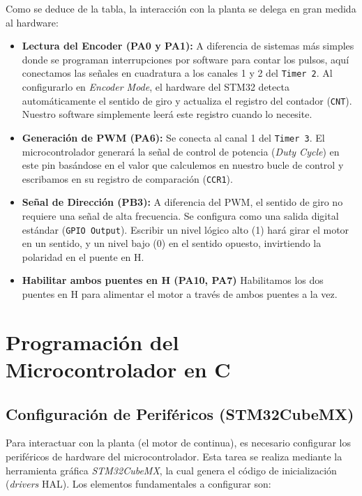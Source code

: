 \documentclass[10pt,a4paper]{report}
\begin{document}
Como se deduce de la tabla, la interacción con la planta se delega en gran medida al hardware:
\begin{itemize}
	\item \textbf{Lectura del Encoder (PA0 y PA1):} A diferencia de sistemas más simples donde se programan interrupciones por software para contar los pulsos, aquí conectamos las señales en cuadratura a los canales 1 y 2 del \texttt{Timer 2}. Al configurarlo en \textit{Encoder Mode}, el hardware del STM32 detecta automáticamente el sentido de giro y actualiza el registro del contador (\texttt{CNT}). Nuestro software simplemente leerá este registro cuando lo necesite.
	
	\item \textbf{Generación de PWM (PA6):} Se conecta al canal 1 del \texttt{Timer 3}. El microcontrolador generará la señal de control de potencia (\textit{Duty Cycle}) en este pin basándose en el valor que calculemos en nuestro bucle de control y escribamos en su registro de comparación (\texttt{CCR1}).
	
	\item \textbf{Señal de Dirección (PB3):} A diferencia del PWM, el sentido de giro no requiere una señal de alta frecuencia. Se configura como una salida digital estándar (\texttt{GPIO Output}). Escribir un nivel lógico alto (1) hará girar el motor en un sentido, y un nivel bajo (0) en el sentido opuesto, invirtiendo la polaridad en el puente en H.
	
	\item \textbf{Habilitar ambos puentes en H (PA10, PA7)} Habilitamos los dos puentes en H para alimentar el motor a través de ambos puentes a la vez. 
\end{itemize}

\chapter{Programación del Microcontrolador en C}



\section{Configuración de Periféricos (STM32CubeMX)}
Para interactuar con la planta (el motor de continua), es necesario configurar los periféricos de hardware del microcontrolador. Esta tarea se realiza mediante la herramienta gráfica \textit{STM32CubeMX}, la cual genera el código de inicialización (\textit{drivers} HAL). Los elementos fundamentales a configurar son:
\end{document}
